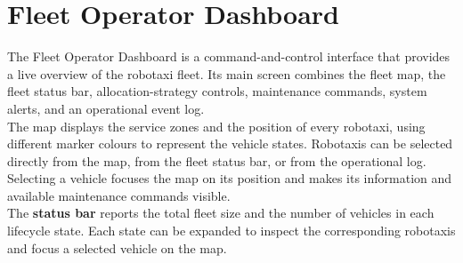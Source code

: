 \documentclass[11pt,a4paper,oneside]{report}
\begin{document}
\section{Fleet Operator Dashboard}
\label{sec:operator-dashboard}

The Fleet Operator Dashboard is a command-and-control interface that
provides a live overview of the robotaxi fleet. Its main screen combines
the fleet map, the fleet status bar, allocation-strategy controls,
maintenance commands, system alerts, and an operational event log.\\
The map displays the service zones and the position of every robotaxi,
using different marker colours to represent the vehicle states.
Robotaxis can be selected directly from the map, from the fleet status
bar, or from the operational log. Selecting a vehicle focuses the map on
its position and makes its information and available maintenance
commands visible.\\
The \textbf{status bar} reports the total fleet size and the number of vehicles
in each lifecycle state. Each state can be expanded to inspect the
corresponding robotaxis and focus a selected vehicle on the map.
\end{document}
